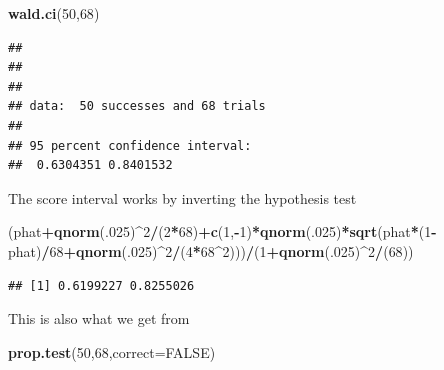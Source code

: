\documentclass[]{book}
\newenvironment{Shaded}{\begin{snugshade}}{\end{snugshade}}
\newcommand{\KeywordTok}[1]{\textcolor[rgb]{0.13,0.29,0.53}{\textbf{#1}}}
\newcommand{\DataTypeTok}[1]{\textcolor[rgb]{0.13,0.29,0.53}{#1}}
\newcommand{\DecValTok}[1]{\textcolor[rgb]{0.00,0.00,0.81}{#1}}
\newcommand{\OtherTok}[1]{\textcolor[rgb]{0.56,0.35,0.01}{#1}}
\newcommand{\OperatorTok}[1]{\textcolor[rgb]{0.81,0.36,0.00}{\textbf{#1}}}
\newcommand{\NormalTok}[1]{#1}
\theoremstyle{definition}
\theoremstyle{definition}
\theoremstyle{definition}
\theoremstyle{remark}
\begin{document}
\begin{Shaded}
\begin{Highlighting}[]
\KeywordTok{wald.ci}\NormalTok{(}\DecValTok{50}\NormalTok{,}\DecValTok{68}\NormalTok{)}
\end{Highlighting}
\end{Shaded}

\begin{verbatim}
## 
## 
## 
## data:  50 successes and 68 trials
## 
## 95 percent confidence interval:
##  0.6304351 0.8401532
\end{verbatim}

The score interval works by inverting the hypothesis test

\begin{Shaded}
\begin{Highlighting}[]
\NormalTok{(phat}\OperatorTok{+}\KeywordTok{qnorm}\NormalTok{(.}\DecValTok{025}\NormalTok{)}\OperatorTok{^}\DecValTok{2}\OperatorTok{/}\NormalTok{(}\DecValTok{2}\OperatorTok{*}\DecValTok{68}\NormalTok{)}\OperatorTok{+}\KeywordTok{c}\NormalTok{(}\DecValTok{1}\NormalTok{,}\OperatorTok{-}\DecValTok{1}\NormalTok{)}\OperatorTok{*}\KeywordTok{qnorm}\NormalTok{(.}\DecValTok{025}\NormalTok{)}\OperatorTok{*}\KeywordTok{sqrt}\NormalTok{(phat}\OperatorTok{*}\NormalTok{(}\DecValTok{1}\OperatorTok{-}\NormalTok{phat)}\OperatorTok{/}\DecValTok{68}\OperatorTok{+}\KeywordTok{qnorm}\NormalTok{(.}\DecValTok{025}\NormalTok{)}\OperatorTok{^}\DecValTok{2}\OperatorTok{/}\NormalTok{(}\DecValTok{4}\OperatorTok{*}\DecValTok{68}\OperatorTok{^}\DecValTok{2}\NormalTok{)))}\OperatorTok{/}\NormalTok{(}\DecValTok{1}\OperatorTok{+}\KeywordTok{qnorm}\NormalTok{(.}\DecValTok{025}\NormalTok{)}\OperatorTok{^}\DecValTok{2}\OperatorTok{/}\NormalTok{(}\DecValTok{68}\NormalTok{))}
\end{Highlighting}
\end{Shaded}

\begin{verbatim}
## [1] 0.6199227 0.8255026
\end{verbatim}

This is also what we get from

\begin{Shaded}
\begin{Highlighting}[]
\KeywordTok{prop.test}\NormalTok{(}\DecValTok{50}\NormalTok{,}\DecValTok{68}\NormalTok{,}\DataTypeTok{correct=}\OtherTok{FALSE}\NormalTok{)}
\end{Highlighting}
\end{Shaded}
\end{document}
